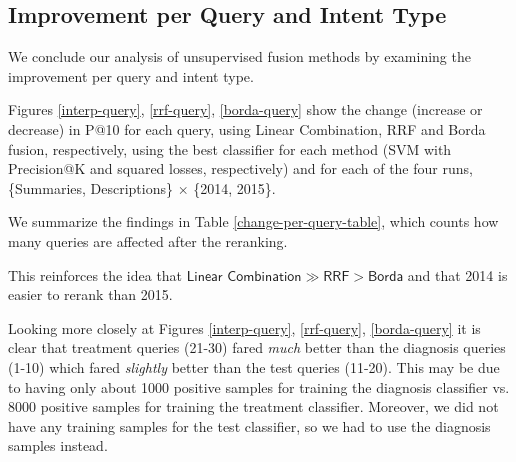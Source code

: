 \subsection{Improvement per Query and Intent Type}
We conclude our analysis of unsupervised fusion methods by examining the improvement per query and intent type.

Figures \ref{interp-query}, \ref{rrf-query}, \ref{borda-query} show the change (increase or decrease) in P@10 for each query,
using Linear Combination, RRF and Borda fusion, respectively, using the best classifier for each method (SVM with
Precision@K and squared losses, respectively) and for each of the four runs, \{Summaries, Descriptions\} $\times$ \{2014, 2015\}.

We summarize the findings in Table \ref{change-per-query-table}, which counts
how many queries are affected after the reranking.

\begin{table}[h!]
\centering
\caption{Number of positively/negatively affected queries for each of the three unsupervised fusion methods, using their best classifier (Tables \ref{interpolation-res}, \ref{rrf-res}
and \ref{borda-res}, respectively).}
\label{change-per-query-table}
\end{table}

This reinforces the idea that $\textsf{Linear Combination} \gg \textsf{RRF} > \textsf{Borda}$
and that 2014 is easier to rerank than 2015.

Looking more closely at Figures \ref{interp-query}, \ref{rrf-query}, \ref{borda-query}
it is clear that
treatment queries (21-30) fared \emph{much} better than the diagnosis queries (1-10)
which fared \emph{slightly} better than the test queries (11-20).
This may be due to having only about 1000 positive samples for training the diagnosis classifier vs. 8000 positive samples
for training the treatment classifier. Moreover, we did not have any training samples for the test classifier,
so we had to use the diagnosis samples instead.

